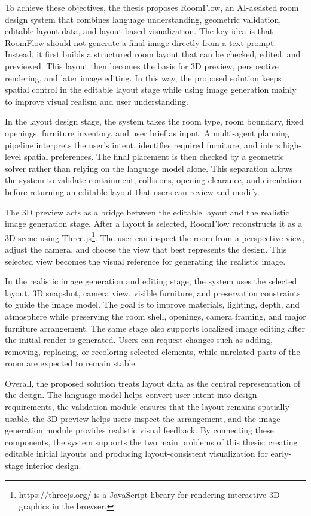 To achieve these objectives, the thesis proposes RoomFlow, an AI-assisted room design system that combines language understanding, geometric validation, editable layout data, and layout-based visualization. The key idea is that RoomFlow should not generate a final image directly from a text prompt. Instead, it first builds a structured room layout that can be checked, edited, and previewed. This layout then becomes the basis for 3D preview, perspective rendering, and later image editing. In this way, the proposed solution keeps spatial control in the editable layout stage while using image generation mainly to improve visual realism and user understanding.

In the layout design stage, the system takes the room type, room boundary, fixed openings, furniture inventory, and user brief as input. A multi-agent planning pipeline interprets the user’s intent, identifies required furniture, and infers high-level spatial preferences. The final placement is then checked by a geometric solver rather than relying on the language model alone. This separation allows the system to validate containment, collisions, opening clearance, and circulation before returning an editable layout that users can review and modify.

The 3D preview acts as a bridge between the editable layout and the realistic image generation stage. After a layout is selected, RoomFlow reconstructs it as a 3D scene using Three.js\footnote{\url{https://threejs.org/} is a JavaScript library for rendering interactive 3D graphics in the browser.}. The user can inspect the room from a perspective view, adjust the camera, and choose the view that best represents the design. This selected view becomes the visual reference for generating the realistic image.

In the realistic image generation and editing stage, the system uses the selected layout, 3D snapshot, camera view, visible furniture, and preservation constraints to guide the image model. The goal is to improve materials, lighting, depth, and atmosphere while preserving the room shell, openings, camera framing, and major furniture arrangement. The same stage also supports localized image editing after the initial render is generated. Users can request changes such as adding, removing, replacing, or recoloring selected elements, while unrelated parts of the room are expected to remain stable.

Overall, the proposed solution treats layout data as the central representation of the design. The language model helps convert user intent into design requirements, the validation module ensures that the layout remains spatially usable, the 3D preview helps users inspect the arrangement, and the image generation module provides realistic visual feedback. By connecting these components, the system supports the two main problems of this thesis: creating editable initial layouts and producing layout-consistent visualization for early-stage interior design.


